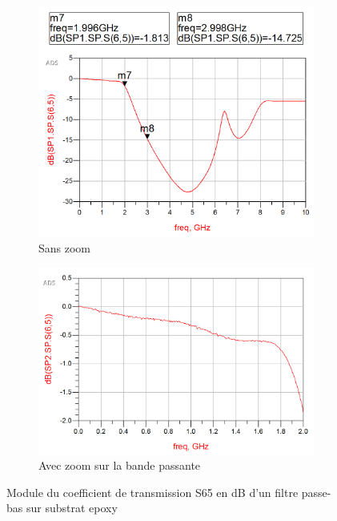 \documentclass[french]{article}
\begin{document}
\begin{figure}[H]
	\centering
	\begin{subfigure}[b]{0.49\textwidth}
		\includegraphics[width=\textwidth]{photo/passe_bas_vic/simu_passe_bas_reel_tche_epoxy.PNG}
		\caption{Sans zoom}
		\label{fig:simu_passe_bas_reel_tche_epoxy}
	\end{subfigure}
	\begin{subfigure}[b]{0.49\textwidth}
		\includegraphics[width=\textwidth]{photo/passe_bas_vic/simu_zoom_passe_bas_reel_tche_epoxy.PNG}
		\caption{Avec zoom sur la bande passante}
		\label{fig:simu_zoom_passe_bas_distribue_ameliore}
	\end{subfigure}
	\caption{Module du coefficient de transmission S65 en dB d'un filtre passe-bas sur substrat epoxy}
\end{figure}
\end{document}
